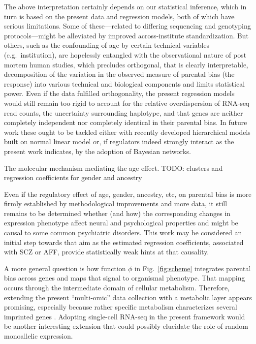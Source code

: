 \documentclass[letterpaper]{article}
\begin{document}
The above interpretation certainly depends on our statistical inference, which
in turn is based on the present data and regression models, both of which have
serious limitations.  Some of these---related to differing sequencing and
genotyping protocols---might be alleviated by improved across-institute
standardization.  But others, such as the confounding of age by certain
technical variables (e.g.~institution), are hopelessly entangled with the
observational nature of post mortem human studies, which precludes orthogonal,
that is clearly interpretable, decomposition of the variation in the observed
measure of parental bias (the response) into various technical and biological
components and limits statistical power.  Even if the data fulfilled
orthogonality, the present regression models would still remain too rigid to
account for the relative overdispersion of RNA-seq read counts, the
uncertainty surrounding haplotype, and that genes are neither completely
independent nor completely identical in their parental bias.  In future work
these ought to be tackled either with recently developed hierarchical models
built on normal linear model \cite{Perez2015,Law2014} or, if regulators indeed
strongly interact as the present work indicates, by the adoption of Bayesian
networks.

The molecular mechanism mediating the age effect.  TODO: clusters and regression
coefficients for gender and ancestry

Even if the regulatory effect of age, gender, ancestry, etc, on parental bias
is more firmly established by methodological improvements and more data, it
still remains to be determined whether (and how) the corresponding changes in
expression phenotype affect neural and psychological properties and might be
causal to some common psychiatric disorders.  This work may be considered an
initial step towards that aim as the estimated regression coefficients,
associated with SCZ or AFF, provide statistically weak hints at that
causality.

A more general question is how function \(\phi\) in Fig.~\ref{fig:scheme}
integrates parental bias across genes and maps that signal to organismal
phenotype.  That mapping occurs through the intermediate domain of cellular
metabolism.  Therefore, extending the present ``multi-omic'' data collection
with a metabolic layer appears promising, especially because rather specific
metabolism characterizes several imprinted genes \cite{Tucci2016,Peters2014}.
Adopting single-cell RNA-seq in the present framework would be another
interesting extension that could possibly elucidate the role of random
monoallelic expression.
\end{document}
